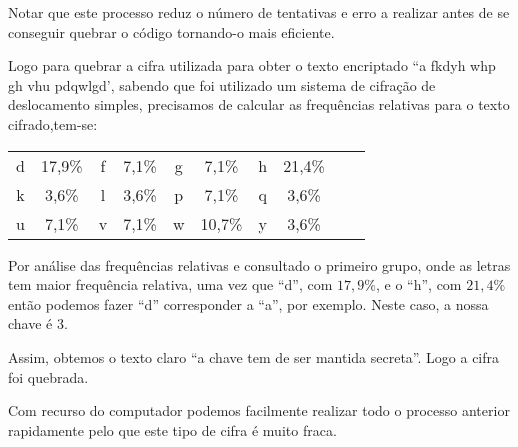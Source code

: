 Notar que este processo reduz o número de tentativas e erro a realizar antes de se conseguir quebrar o código tornando-o mais eficiente.

Logo para quebrar a cifra utilizada para obter o texto encriptado ``a fkdyh whp gh vhu pdqwlgd', sabendo que foi utilizado um sistema de cifração de deslocamento simples, precisamos de calcular as frequências relativas para o texto cifrado,tem-se:


\begin{table}[h]
\centering
\begin{tabular}{>{\columncolor{gray!20}}cccccccccc}
d & 17,9\% & \cellcolor{gray!20}f & 7,1\% & \cellcolor{gray!20}g & 7,1\% & \cellcolor{gray!20}h & 21,4\% \\
k & 3,6\% & \cellcolor{gray!20}l & 3,6\% & \cellcolor{gray!20}p & 7,1\% & \cellcolor{gray!20}q & 3,6\% \\
u & 7,1\% & \cellcolor{gray!20}v & 7,1\% & \cellcolor{gray!20}w & 10,7\% & \cellcolor{gray!20}y & 3,6\% \\
\end{tabular}
\end{table}
Por análise das frequências relativas e consultado o primeiro grupo, onde as letras tem maior frequência relativa, uma vez que ``d'', com $17,9\%$, e o ``h'', com $21,4\%$ então podemos fazer ``d'' corresponder a ``a'', por exemplo. Neste caso, a nossa chave é 3.

Assim, obtemos o texto claro ``a chave tem de ser mantida secreta''. Logo a cifra foi quebrada.~\cite{Quaresma2009a}

Com recurso do computador podemos facilmente realizar todo o processo anterior rapidamente pelo que este tipo de cifra é muito fraca.
